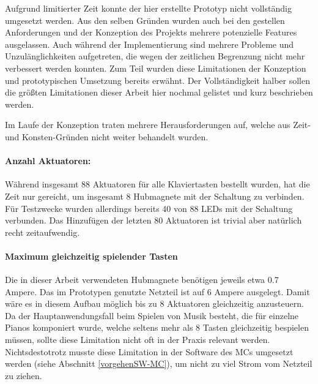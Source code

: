 Aufgrund limitierter Zeit konnte der hier erstellte Prototyp nicht vollständig umgesetzt werden.
Aus den selben Gründen wurden auch bei den gestellen Anforderungen und der Konzeption des Projekts mehrere potenzielle Features ausgelassen.
Auch während der Implementierung sind mehrere Probleme und Unzulänglichkeiten aufgetreten, die wegen der zeitlichen Begrenzung nicht mehr verbessert werden konnten.
Zum Teil wurden diese Limitationen der Konzeption und prototypischen Umsetzung bereits erwähnt.
Der Vollständigkeit halber sollen die größten Limitationen dieser Arbeit hier nochmal gelistet und kurz beschrieben werden.

Im Laufe der Konzeption traten mehrere Herausforderungen auf, welche aus Zeit- und Konsten-Gründen nicht weiter behandelt wurden.

\paragraph{Anzahl Aktuatoren:}
Während insgesamt 88 Aktuatoren für alle Klaviertasten bestellt wurden, hat die Zeit nur gereicht, um insgesamt 8 Hubmagnete mit der Schaltung zu verbinden.
Für Testzwecke wurden allerdings bereits 40 von 88 LEDs mit der Schaltung verbunden.
Das Hinzufügen der letzten 80 Aktuatoren ist trivial aber natürlich recht zeitaufwendig.

\paragraph{Maximum gleichzeitig spielender Tasten}
Die in dieser Arbeit verwendeten Hubmagnete benötigen jeweils etwa 0.7 Ampere.
Das im Prototypen genutzte Netzteil ist auf 6 Ampere ausgelegt.
Damit wäre es in diesem Aufbau möglich bis zu 8 Aktuatoren gleichzeitig anzusteuern.
Da der Hauptanwendungsfall beim Spielen von Musik besteht, die für einzelne Pianos komponiert wurde, welche seltens mehr als 8 Tasten gleichzeitig bespielen müssen, sollte diese Limitation nicht oft in der Praxis relevant werden.
Nichtsdestotrotz musste diese Limitation in der Software des \ac{MC}s umgesetzt werden (siehe Abschnitt \ref{vorgehenSW-MC}), um nicht zu viel Strom vom Netzteil zu ziehen.

